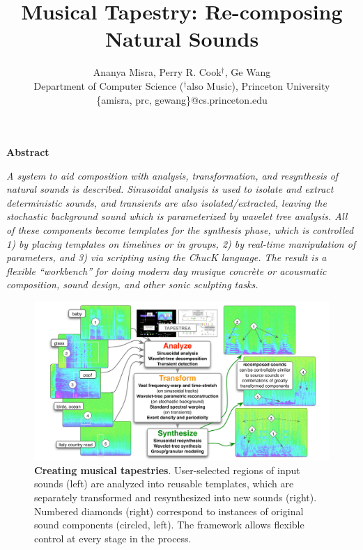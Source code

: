 \documentclass[10pt,letterpaper]{article}
\begin{document}
\twocolumn

\title{\textbf{Musical Tapestry: Re-composing Natural Sounds}}
\author{
Ananya Misra, Perry R. Cook$^{\dag}$, Ge Wang\\
Department of Computer Science ($^{\dag}$also Music), Princeton University \\
\{amisra, prc, gewang\}@cs.princeton.edu\\
}
\date{}     %
\maketitle

\pagestyle{empty}          %
\thispagestyle{empty}      %


\begin{center}
\large{\textbf{Abstract}}
\end{center}
\hspace*{-0.1in}                       %
\noindent
\textit{
A system to aid composition with analysis, transformation,
and resynthesis of natural sounds is described.  Sinusoidal 
analysis is used to isolate and extract deterministic sounds, 
and transients are also isolated/extracted, leaving the 
stochastic background sound which is parameterized 
by wavelet tree analysis.   All of these components 
become templates for the synthesis phase, which is 
controlled 1) by placing templates on timelines or in groups,
2) by real-time manipulation of parameters,
and 3) via scripting using the ChucK language.  
The result is a flexible ``workbench'' for doing modern day
musique concr\`{e}te or acousmatic composition, sound 
design, and other sonic sculpting tasks.
}

\begin{figure}[tbh!]
\centering
    \includegraphics[width=.95\textwidth]{teaser.pdf}
    \caption{\textbf{Creating musical tapestries}.  User-selected regions of input sounds (left) are 
    analyzed into reusable templates, which are separately transformed and resynthesized into
    new sounds (right). Numbered diamonds (right) correspond to instances of original sound
    components (circled, left).  The framework allows flexible control at every stage in the process.} 
    \label{fig:teaser}
\end{figure}
\end{document}
